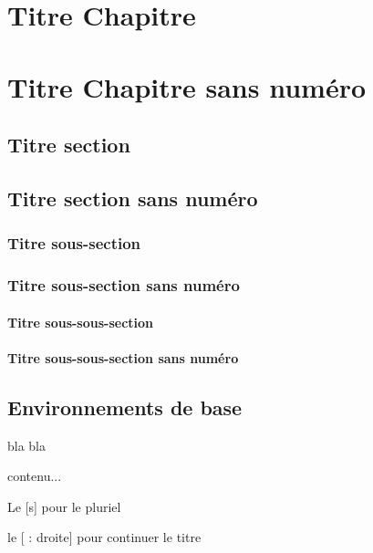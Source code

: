 \documentclass[a4paper,12pt,french]{book}
\begin{document}
\chapter{Titre Chapitre}
\chapter*{Titre Chapitre sans numéro}

\section{Titre section}
\section*{Titre section sans numéro}

\subsection{Titre sous-section}
\subsection*{Titre sous-section sans numéro}
\subsubsection{Titre sous-sous-section}
\subsubsection*{Titre sous-sous-section sans numéro}

\newpage

\section*{Environnements de base}

\begin{aretenir}
	bla bla
\end{aretenir}

\begin{attention}
	contenu...
\end{attention}

\begin{notation}[s]
	Le [s] pour le pluriel
\end{notation}

\begin{definition}[ : droite]
	le [ : droite] pour continuer le titre
\end{definition}
\end{document}
